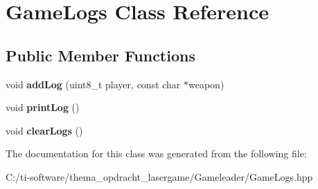 \hypertarget{class_game_logs}{}\section{Game\+Logs Class Reference}
\label{class_game_logs}
\subsection*{Public Member Functions}
\begin{DoxyCompactItemize}
\item 
\mbox{\label{class_game_logs_aff50867c6abefacf3d80180015f94e70}} 
void {\bfseries add\+Log} (uint8\+\_\+t player, const char $\ast$weapon)
\item 
\mbox{\label{class_game_logs_a2af40236b4dc804f4dc0fac938d0bfd9}} 
void {\bfseries print\+Log} ()
\item 
\mbox{\label{class_game_logs_ab645b6718f2d5ee716c8b4df4dddf561}} 
void {\bfseries clear\+Logs} ()
\end{DoxyCompactItemize}


The documentation for this class was generated from the following file\+:\begin{DoxyCompactItemize}
\item 
C\+:/ti-\/software/thema\+\_\+opdracht\+\_\+lasergame/\+Gameleader/Game\+Logs.\+hpp\end{DoxyCompactItemize}
